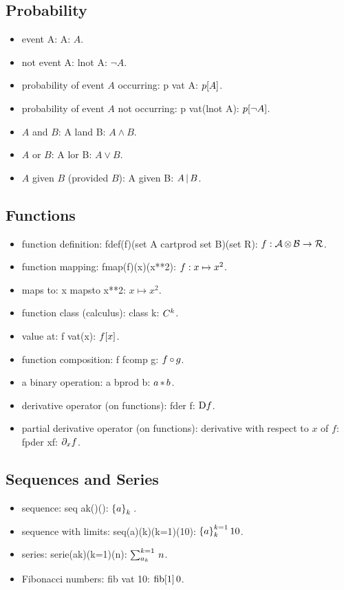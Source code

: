 \begin{multicols}{2}
\subsection{Probability}
\begin{itemize}
\item event A: A: $A$.
\item not event A: lnot A: $\lnot A$.
\item probability of event $A$ occurring: p vat A: $p\!\left[{A}\right]$.
\item probability of event $A$ not occurring: p vat(lnot A): $p\!\left[{\lnot A}\right]$.
\item $A$ and $B$: A land B: $A\land B$.
\item $A$ or $B$: A lor B: $A\lor B$.
\item $A$ given $B$ (provided $B$): A given B: $A\operatorname{\vert} B$.
\end{itemize}


\subsection{Functions}
\begin{itemize}
\item function definition: fdef(f)(set A cartprod set B)(set R): ${f}:{\mathcal{A}\operatorname{\otimes}\mathcal{B}}\to{\mathcal{R}}$.
\item function mapping: fmap(f)(x)(x**2): ${f}:{x}\mapsto{x^2}$.
\item maps to: x mapsto x**2: $x\mapsto x^2$.
\item function class (calculus): class k: $C^{k}$.
\item value at: f vat(x): $f\!\left[{x}\right]$.
\item function composition: f fcomp g: $f\operatorname{\circ} g$.
\item a binary operation: a bprod b: $a\operatorname{\ast} b$.
\item derivative operator (on functions): fder f: $\mathrm{D} f$.
\item partial derivative operator (on functions): derivative with respect to $x$ of $f$: fpder xf: $\partial_{x}f$.
\end{itemize}


\subsection{Sequences and Series}
\begin{itemize}
\item sequence: seq ak()(): $\left\lbrace{{a}}\right\rbrace_{k}^{}{}$.
\item sequence with limits: seq(a)(k)(k=1)(10): $\left\lbrace{{a}}\right\rbrace_{k}^{k=1}{10}$.
\item series: serie(ak)(k=1)(n): $\sum_{a_k}^{k = 1}\,{n}$.
\item Fibonacci numbers: fib vat 10: $\operatorname{fib}\!\left[{1}\right]0$.
\end{itemize}



\end{multicols}
